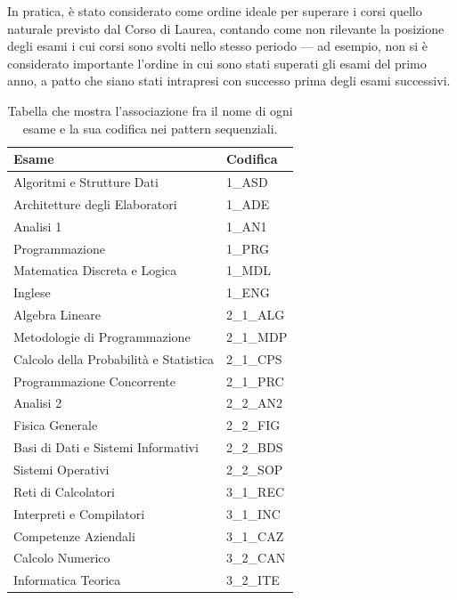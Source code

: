     \vspace{0.35cm}

    In pratica, è stato considerato come ordine ideale per superare i corsi quello naturale previsto dal Corso di Laurea, contando come non rilevante la posizione degli esami i cui corsi sono svolti nello stesso periodo --- ad esempio, non si è considerato importante l'ordine in cui sono stati superati gli esami del primo anno, a patto che siano stati intrapresi con successo prima degli esami successivi. \\

    \begin{table}
    \begin{tabular}{ll}
    \hline
    \textbf{Esame}                         & \textbf{Codifica} \\ \hline
    Algoritmi e Strutture Dati             & 1\_ASD            \\
    Architetture degli Elaboratori         & 1\_ADE            \\
    Analisi 1                              & 1\_AN1            \\
    Programmazione                         & 1\_PRG            \\
    Matematica Discreta e Logica           & 1\_MDL            \\
    Inglese                                & 1\_ENG            \\
    Algebra Lineare                        & 2\_1\_ALG         \\
    Metodologie di Programmazione          & 2\_1\_MDP         \\
    Calcolo della Probabilità e Statistica & 2\_1\_CPS         \\
    Programmazione Concorrente             & 2\_1\_PRC         \\
    Analisi 2                              & 2\_2\_AN2         \\
    Fisica Generale                        & 2\_2\_FIG         \\
    Basi di Dati e Sistemi Informativi     & 2\_2\_BDS         \\
    Sistemi Operativi                      & 2\_2\_SOP         \\
    Reti di Calcolatori                    & 3\_1\_REC         \\
    Interpreti e Compilatori               & 3\_1\_INC         \\
    Competenze Aziendali                   & 3\_1\_CAZ         \\
    Calcolo Numerico                       & 3\_2\_CAN         \\
    Informatica Teorica                    & 3\_2\_ITE         \\ \hline
    \end{tabular}
    \caption{Tabella che mostra l'associazione fra il nome di ogni esame e la sua codifica nei pattern sequenziali.}
    \label{exams_code}
    \end{table}

